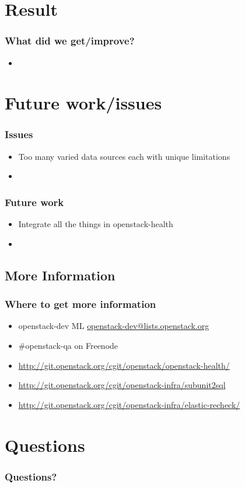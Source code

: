\documentclass[aspectratio=169,11pt,hyperref={colorlinks=true}]{beamer}
\begin{document}
\section{Result}
\begin{frame}
    \frametitle{What did we get/improve?}
    \begin{itemize}
        \item
    \end{itemize}
\end{frame}

\section{Future work/issues}

\begin{frame}
    \frametitle{Issues}
    \begin{itemize}
        \item Too many varied data sources each with unique limitations
        \item
    \end{itemize}
\end{frame}

\begin{frame}
    \frametitle{Future work}
    \begin{itemize}
        \item Integrate all the things in openstack-health
        \item
    \end{itemize}
\end{frame}

\subsection{More Information}
\begin{frame}
\frametitle{Where to get more information}
    \begin{itemize}
        \item openstack-dev ML\: \href{mailto:openstack-dev@lists.openstack.org}{openstack-dev@lists.openstack.org}
        \item \#openstack-qa on Freenode
        \item \href{http://git.openstack.org/cgit/openstack/openstack-health/}{http://git.openstack.org/cgit/openstack/openstack-health/}
        \item \href{http://git.openstack.org/cgit/openstack-infra/subunit2sql}{http://git.openstack.org/cgit/openstack-infra/subunit2sql}
        \item \href{http://git.openstack.org/cgit/openstack-infra/elastic-recheck/}{http://git.openstack.org/cgit/openstack-infra/elastic-recheck/}
    \end{itemize}
\end{frame}

\section{Questions}
\begin{frame}
\frametitle{Questions?}
\end{frame}

\end{document}
